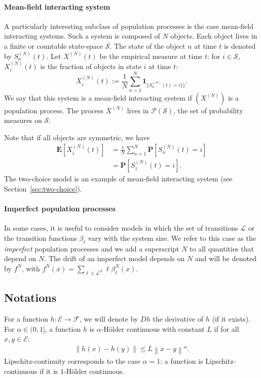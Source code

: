 \documentclass[sigconf]{acmart}
\newcommand\SN{S^{(N)}}
\newcommand\XN{X^{(N)}}
\newcommand\E{\mathcal{E}}
\newcommand\calL{\mathcal{L}}
\newcommand\calF{\mathcal{F}}
\newcommand\calP{\mathcal{P}}
\newcommand\calS{\mathcal{S}}
\newcommand\esp[1]{\mathbf{E}\left[#1\right]}
\newcommand\Proba[1]{\mathbf{P}\left[#1\right]}
\newcommand\norm[1]{\left\|#1\right\|}
\newcommand\Ind[1]{\mathbf{1}_{\{#1\}}}
\begin{document}
\paragraph*{Mean-field interacting system}
A particularly interesting subclass of population processes is the
case mean-field interacting systems. Such a system is composed of $N$
objects. Each object lives in a finite or countable state-space
$\calS$. The state of the object $n$ at time $t$ is denoted by
$\SN_n(t)$. Let $\XN(t)$ be the empirical measure at time $t$: for
$i\in\calS$, $\XN_i(t)$ is the fraction of objects in state $i$ at
time $t$:
\begin{equation*}
  \XN_i(t) := \frac{1}{N}\sum_{n=1}^N \Ind{\SN_n(t)=i\}}.
\end{equation*}
We say that this system is a mean-field interacting system if $(\XN)$
is a population process.  The process $\XN$ lives in $\calP(\calS)$,
the set of probability measures on $\calS$.

Note that if all objects are symmetric, we have
\begin{align}
  \esp{\XN_i(t)} &= \frac{1}{N} \sum_{n=1}^N \Proba{\SN_n(t)=i}\nonumber\\
  &=\Proba{\SN_1(t)=i}. \label{eq:symmetric}
\end{align}
The two-choice model is an example of mean-field interacting system
(see Section~\ref{sec:two-choice}).

\paragraph*{Imperfect population processes}

In some cases, it is useful to consider models in which the set of
transitions $\calL$ or the transition functions $\beta_\ell$ vary with
the system size. We refer to this case as the \emph{imperfect}
population processes and we add a superscript $N$ to all quantities
that depend on $N$. The drift of an imperfect model depends on $N$ and
will be denoted by $f^N$, with
$f^N(x) = \sum_{\ell\in\calL^N}\ell\beta^N_{\ell}(x)$. 



\subsection{Notations}


For a function $h:\E\to\calF$, we will denote by $Dh$ the derivative
of $h$ (if it exists). For $\alpha\in(0,1]$, a function $h$ is
$\alpha$-Hölder continuous with constant $L$ if for all $x,y\in\E$:
\begin{align*}
  \norm{h(x)-h(y)}\le L\norm{x-y}^\alpha. 
\end{align*} 
Lipschitz-continuity corresponds to the case $\alpha=1$: a function is
Lipschitz-continuous if it is $1$-Hölder continuous.
\end{document}
